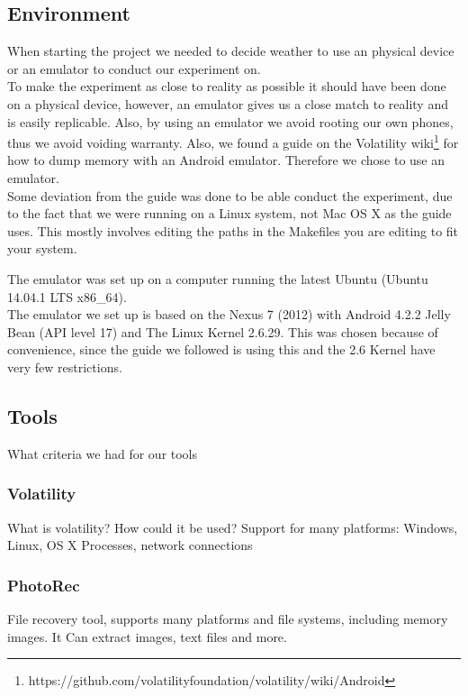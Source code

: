 \subsection{Environment}
When starting the project we needed to decide weather to use an physical device or an emulator
to conduct our experiment on.\\
To make the experiment as close to reality as possible it should have been done on a physical device, 
however, an emulator gives us a close match to reality and is easily replicable. Also, by using an emulator 
we avoid rooting our own phones, thus we avoid voiding warranty. Also, we found a guide on the Volatility 
wiki\footnote{https://github.com/volatilityfoundation/volatility/wiki/Android} for how to dump memory with 
an Android emulator. Therefore we chose to use an emulator.\\
Some deviation from the guide was done to be able conduct the experiment, due to the fact that we were running on 
a Linux system, not Mac OS X as the guide uses. This mostly involves editing the paths in the Makefiles you are editing 
to fit your system. %

The emulator was set up on a computer running the latest Ubuntu (Ubuntu 14.04.1 LTS x86\_64).\\
The emulator we set up is based on the Nexus 7 (2012) with Android 4.2.2 Jelly Bean (API level 17) and The Linux Kernel 2.6.29. 
This was chosen because of convenience, since the guide we followed is using this and the 2.6 Kernel have very few restrictions.
\subsection{Tools}
What criteria we had for our tools
  \subsubsection{Volatility} %
  What is volatility? How could it be used?
  Support for many platforms: Windows, Linux, OS X
  Processes, network connections
  \subsubsection{PhotoRec}
  File recovery tool, supports many platforms and file systems, including memory images. 
  It Can extract images, text files and more.
